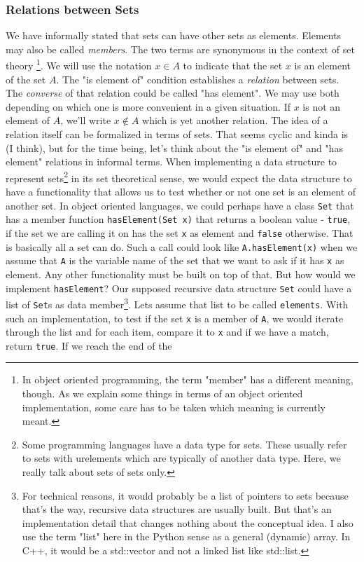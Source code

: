 
\subsubsection{Relations between Sets}
We have informally stated that sets can have other sets as elements. Elements may also be called \emph{members}. The two terms are synonymous in the context of set theory \footnote{In object oriented programming, the term "member" has a different meaning, though. As we explain some things in terms of an object oriented implementation, some care has to be taken which meaning is currently meant.}. We will use the notation $x \in A$ to indicate that the set $x$ is an element of the set $A$. The "is element of" condition establishes a \emph{relation} between sets. The \emph{converse} of that relation could be called  "has element". We may use both depending on which one is more convenient in a given situation. If $x$ is not an element of $A$, we'll write $x \notin A$ which is yet another relation. The idea of a relation itself can be formalized in terms of sets. That seems cyclic and kinda is (I think), but for the time being, let's think about the "is element of" and "has element" relations in informal terms.  When implementing a data structure to represent sets\footnote{Some programming languages have a data type for sets. These usually refer to sets with urelements which are typically of another data type. Here, we really talk about sets of sets only.} in its set theoretical sense, we would expect the data structure to have a functionality that allows us to test whether or not one set is an element of another set. In object oriented languages, we could perhaps have a class \verb|Set| that has a member function \verb|hasElement(Set x)| that returns a boolean value - \verb|true|, if the set we are calling it on has the set \verb|x| as element and \verb|false| otherwise. That is basically all a set can do. Such a call could look like \verb|A.hasElement(x)| when we assume that \verb|A| is the variable name of the set that we want to ask if it has \verb|x| as element. Any other functionality must be built on top of that. But how would we implement \verb|hasElement|? Our supposed recursive data structure \verb|Set| could have a list of \verb|Set|s as data member\footnote{For technical reasons, it would probably be a list of pointers to sets because that's the way, recursive data structures are usually built. But that's an implementation detail that changes nothing about the conceptual idea. I also use the term "list" here in the Python sense as a general (dynamic) array. In C++, it would be a std::vector and not a linked list like std::list.}. Lets assume that list to be called \verb|elements|. With such an implementation, to test if the set \verb|x| is a member of \verb|A|, we would iterate through the list and for each item, compare it to \verb|x| and if we have a match, return \verb|true|. If we reach the end of the 